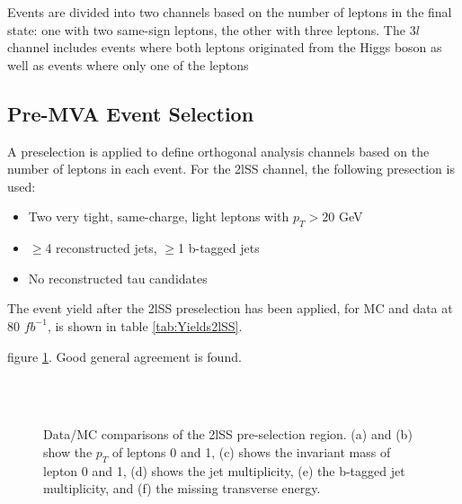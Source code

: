 Events are divided into two channels based on the number of leptons in the final state: one with two same-sign leptons, the other with three leptons. The $3l$ channel includes events where both leptons originated from the Higgs boson as well as events where only one of the leptons 


\subsection{Pre-MVA Event Selection}
\label{subsec:preMVA}

A preselection is applied to define orthogonal analysis channels based on the number of leptons in each event. For the 2lSS channel, the following presection is used:

\begin{itemize}
  \item Two very tight, same-charge, light leptons with $p_T > 20$ GeV
  \item $\geq$4 reconstructed jets, $\geq$1 b-tagged jets
  \item No reconstructed tau candidates
\end{itemize}

The event yield after the 2lSS preselection has been applied, for MC and data at 80 $fb^{-1}$, is shown in table \ref{tab:Yields2lSS}. 



figure \ref{fig:presel2lSS}. Good general agreement is found.

\begin{figure}[h!]
    \\
    \\
    \caption{Data/MC comparisons of the 2lSS pre-selection region. (a) and (b) show the $p_T$ of leptons 0 and 1, (c) shows the invariant mass of lepton 0 and 1, (d) shows the jet multiplicity, (e) the b-tagged jet multiplicity, and (f) the missing transverse energy.}                           
    \label{fig:presel2lSS}
\end{figure}

